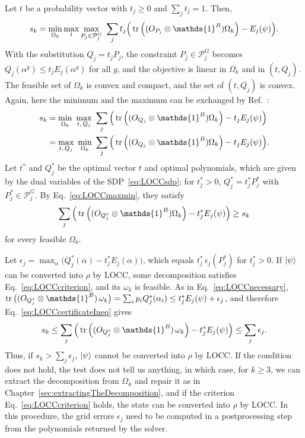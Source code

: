 \documentclass[11pt,a4paper]{report}
\newcommand{\one}{\mathds{1}}
\newcommand{\I}{\one}
\renewcommand{\a}{\alpha}
\begin{document}
Let $t$ be a probability vector with $t_j \geq 0$ and $\sum_j t_j = 1$. Then,
\begin{align}\label{eq:LOCCminmaxT}
    s_k=\min_{\Omega_k} \max_t \max_{P_j\in\mathcal{P}^G_j}\ \sum_j t_j\Big(\tr\left((O_{P_j}\otimes\I^B)\Omega_k\right)-E_j(\psi)\Big).
\end{align}
With the substitution $Q_j=t_jP_j$, the constraint $P_j\in\mathcal{P}^G_j$ becomes $Q_j(\a^g)\leq t_jE_j(\a^g)$ for all $g$, and the objective is linear in $\Omega_k$ and in $(t,Q_j)$. The feasible set of $\Omega_k$ is convex and compact, and the set of $(t,Q_j)$ is convex. Again, here the minimum and the maximum can be exchanged by Ref.~\cite{Sion1958}:
\begin{align}\label{eq:LOCCmaxmin}
    s_k&=\min_{\Omega_k}\ \max_{t,\,Q_j}\ \sum_j \Big(\tr\left((O_{Q_j}\otimes\I^B)\Omega_k\right)-t_jE_j(\psi)\Big)\nonumber\\
    &=\max_{t,\,Q_j}\ \min_{\Omega_k}\ \sum_j \Big(\tr\left((O_{Q_j}\otimes\I^B)\Omega_k\right)-t_jE_j(\psi)\Big).
\end{align}
Let $t^*$ and $Q_j^*$ be the optimal vector $t$ and optimal polynomials, which are given by the dual variables of the SDP~\eqref{eq:LOCCsdp}; for $t^*_j>0$, $Q^*_j=t^*_jP^*_j$ with $P^*_j\in\mathcal{P}^G_j$.
By Eq.~\eqref{eq:LOCCmaxmin}, they satisfy
\begin{equation}\label{eq:LOCCcertificateIneq}
    \sum_j \Big(\tr\left((O_{Q^*_j}\otimes\I^B)\Omega_k\right)-t^*_jE_j(\psi)\Big)\geq s_k
\end{equation}
for every feasible $\Omega_k$.

Let $\epsilon_j=\max_\a\big(Q^*_j(\a)-t^*_jE_j(\a)\big)$, which equals $t^*_j\,\epsilon_j(P^*_j)$ for $t^*_j>0$. If $\ket{\psi}$ can be converted into $\rho$ by LOCC, some decomposition satisfies Eq.~\eqref{eq:LOCCcriterion}, and its $\omega_k$ is feasible. As in Eq.~\eqref{eq:LOCCnecessary}, $\tr\big((O_{Q^*_j}\otimes\I^B)\,\omega_k\big)=\sum_ip_iQ^*_j(\a_i) \leq t^*_jE_j(\psi)+\epsilon_j$, and therefore Eq.~\eqref{eq:LOCCcertificateIneq} gives
\begin{equation}
    s_k \leq \sum_j \Big(\tr\left((O_{Q^*_j}\otimes\I^B)\,\omega_k \right)-t^*_jE_j(\psi)\Big) \leq \sum_j \epsilon_j.
\end{equation}
Thus, if $s_k > \sum_j \epsilon_j$, $\ket{\psi}$ cannot be converted into $\rho$ by LOCC. If the condition does not hold, the test does not tell us anything, in which case, for $k\geq3$, we can extract the decomposition from $\Omega_k$ and repair it as in Chapter~\ref{sec:extractingTheDecomposition}, and if the criterion Eq.~\eqref{eq:LOCCcriterion} holds, the state can be converted into $\rho$ by LOCC.
In this procedure, the grid errors $\epsilon_j$ need to be computed in a postprocessing step from the polynomials returned by the solver.
\end{document}
